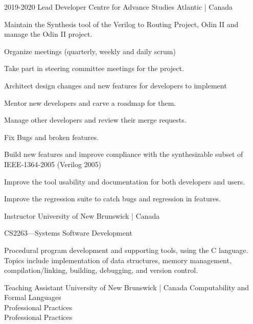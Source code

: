 \documentclass{developercv} %
\begin{document}
\begin{entrylist}
	\entry
	{2019-2020}
	{Lead Developer}
	{Centre for Advance Studies Atlantic | Canada}{
        Maintain the Synthesis tool of the Verilog to Routing Project, Odin II and manage the Odin II project.
        \begin{tightemize}
            \item Organize meetings (quarterly, weekly and daily scrum)
            \item Take part in steering committee meetings for the project.
            \item Architect design changes and new features for developers to implement
            \item Mentor new developers and carve a roadmap for them.
            \item Manage other developers and review their merge requests.
            \item Fix Bugs and broken features.
            \item Build new features and improve compliance with the synthesizable subset of IEEE-1364-2005 (Verilog 2005)
            \item Improve the tool usability and documentation for both developers and users.
            \item Improve the regression suite to catch bugs and regression in features.
        \end{tightemize}
	}

	{Instructor}
	{University of New Brunswick | Canada}{
	\textbullet{} CS2263---Systems Software Development
	\begin{quoting}
		Procedural program development and supporting tools, using the C language.
		Topics include implementation of data structures, memory management, compilation/linking, building, debugging, and version control.
	\end{quoting}
	}

	{Teaching Assistant}
	{University of New Brunswick | Canada}
	{
	\textbullet{} Computability and Formal Languages\\
	\textbullet{} Professional Practices\\
	\textbullet{} Professional Practices\\
	}


\end{entrylist}
\end{document}
